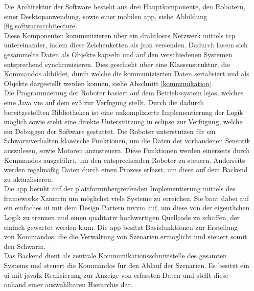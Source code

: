 Die Architektur der Software besteht aus drei Hauptkomponente, den Robotern, einer Desktopanwendung, sowie einer mobilen \gls{app}, siehe Abbildung \eqref{fig:softwarearchitecture}.\\
Diese Komponenten kommunizieren über ein drahtloses Netzwerk mittels \gls{tcp} untereinander, indem diese Zeichenketten als \gls{json} versenden. Dadurch lassen sich gesammelte Daten als Objekte kapseln und auf den verschiedenen Systemen entsprechend synchronisieren. Dies geschieht über eine Klassenstruktur, die Kommandos abbildet, durch welche die kommunizierten Daten serialisiert und als Objekte dargestellt werden können, siehe Abschnitt \eqref{kommunikation}.\\
Die Programmierung der Roboter basiert auf dem Betriebssystem \gls{lejos}, welches eine Java \gls{vm} auf dem \gls{ev3} zur Verfügung stellt. Durch die dadurch bereitgestellten Bibliotheken ist eine unkomplizierte Implementierung der Logik möglich sowie steht eine direkte Unterstützung in \gls{eclipse} zur Verfügung, welche ein Debuggen der Software gestattet. Die Roboter unterstützen für ein Schwarmverhalten klassische Funktionen, um die Daten der vorhandenen Sensorik auszulesen, sowie Motoren anzusteuern. Diese Funktionen werden einerseits durch Kommandos ausgeführt, um den entsprechenden Roboter zu steuern. Anderseits werden regelmäßig Daten durch einen Prozess erfasst, um diese auf dem Backend zu aktualisieren.\\
Die \gls{app} beruht auf der plattformübergreifenden Implementierung mittels des \glspl{framework} Xamarin um möglichst viele Systeme zu erreichen. Sie baut dabei auf ein einfaches \gls{ui} mit dem Design Pattern \gls{mvvm} auf, um diese von der eigentlichen Logik zu trennen und einen qualitativ hochwertigen Quellcode zu schaffen, der einfach gewartet werden kann. Die \gls{app} besitzt Basisfunktionen zur Erstellung von Kommandos, die die Verwaltung von Szenarien ermöglicht und steuert somit den Schwarm.\\
Das Backend dient als zentrale Kommunikationsschnittstelle des gesamten Systems und steuert die Kommandos für den Ablauf der Szenarien. Es besitzt ein \gls{ui} mit \gls{javafx} Realisierung zur Anzeige von erfassten Daten und stellt diese anhand einer auswählbaren Hierarchie dar.

